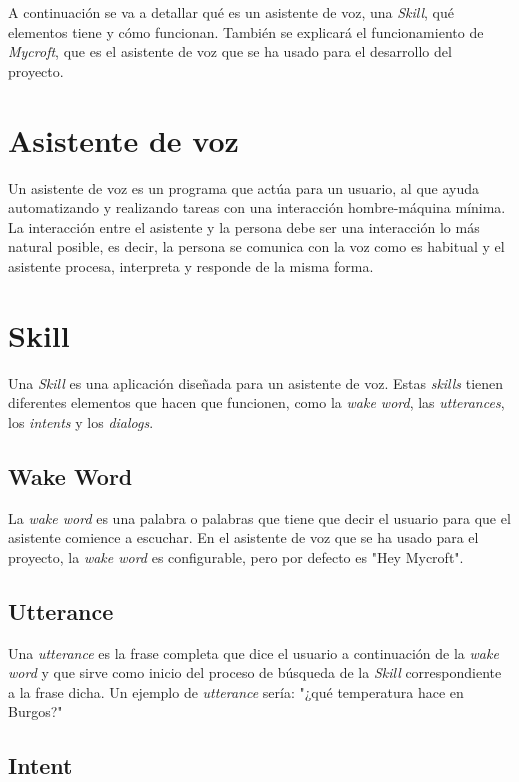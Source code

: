 
A continuación se va a detallar qué es un asistente de voz, una \textit{Skill}, qué elementos tiene y cómo funcionan. También se explicará el funcionamiento de \textit{Mycroft}, que es el asistente de voz que se ha usado para el desarrollo del proyecto.

\section{Asistente de voz}

Un asistente de voz es un programa que actúa para un usuario, al que ayuda automatizando y realizando tareas con una interacción hombre-máquina mínima. La interacción entre el asistente y la persona debe ser una interacción lo más natural posible, es decir, la persona se comunica con la voz como es habitual y el asistente procesa, interpreta y responde de la misma forma.

\section{Skill}

Una \textit{Skill} es una aplicación diseñada para un asistente de voz. Estas \textit{skills} tienen diferentes elementos que hacen que funcionen, como la \textit{wake word}, las \textit{utterances}, los \textit{intents} y los \textit{dialogs}.

\subsection{Wake Word}

La \textit{wake word} es una palabra o palabras que tiene que decir el usuario para que el asistente comience a escuchar. En el asistente de voz que se ha usado para el proyecto, la \textit{wake word} es configurable, pero por defecto es "Hey Mycroft".

\subsection{Utterance}

Una \textit{utterance} es la frase completa que dice el usuario a continuación de la \textit{wake word} y que sirve como inicio del proceso de búsqueda de la \textit{Skill} correspondiente a la frase dicha. Un ejemplo de \textit{utterance} sería: "¿qué temperatura hace en Burgos?"

\subsection{Intent}

